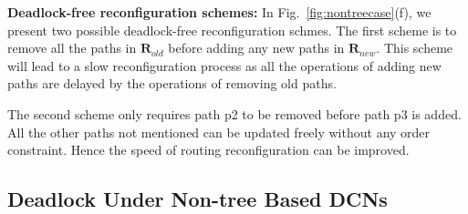 \textbf{Deadlock-free reconfiguration schemes:} In Fig.~\ref{fig:nontreecase}(f), we present two possible deadlock-free reconfiguration schmes. The first scheme is to remove all the paths in $\textbf{R}_{old}$ before adding any new paths in $\textbf{R}_{new}$. This scheme will lead to a slow reconfiguration process as all the operations of adding new paths are delayed by the operations of removing old paths. 

The second scheme only requires path p2 to be removed before path p3 is added. All the other paths not mentioned can be updated freely without any order constraint. Hence the speed of routing reconfiguration can be improved.


\subsection{Deadlock Under Non-tree Based DCNs}\label{subsec:nontreecase}

